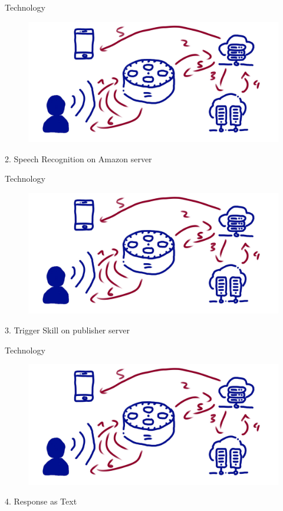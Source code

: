 \documentclass[aspectratio=169]{beamer}
\begin{document}
\begin{frame}{Technology}
\begin{figure}
	\includegraphics[width=0.9\linewidth]{images/alexatech}
\end{figure}
2. Speech Recognition on Amazon server
\end{frame}

\begin{frame}{Technology}
\begin{figure}
	\includegraphics[width=0.9\linewidth]{images/alexatech}
\end{figure}
3. Trigger Skill on publisher server
\end{frame}

\begin{frame}{Technology}
\begin{figure}
	\includegraphics[width=0.9\linewidth]{images/alexatech}
\end{figure}
4. Response as Text
\end{frame}
\end{document}
